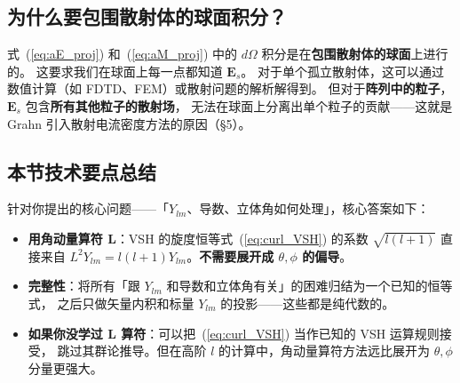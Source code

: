 \subsection{为什么要包围散射体的球面积分？}

\begin{noteworthy}
式~(\ref{eq:aE_proj}) 和~(\ref{eq:aM_proj}) 中的 $d\Omega$ 积分是在\textbf{包围散射体的球面}上进行的。
这要求我们在球面上每一点都知道 $\mathbf{E}_s$。
对于单个孤立散射体，这可以通过数值计算（如 FDTD、FEM）或散射问题的解析解得到。
但对于\textbf{阵列中的粒子}，$\mathbf{E}_s$ 包含\textbf{所有其他粒子的散射场}，
无法在球面上分离出单个粒子的贡献——这就是 Grahn 引入散射电流密度方法的原因（\S5）。
\end{noteworthy}

\subsection{本节技术要点总结}

针对你提出的核心问题——「$Y_{lm}$、导数、立体角如何处理」，核心答案如下：

\begin{itemize}
  \item \textbf{用角动量算符 $\mathbf{L}$}：VSH 的旋度恒等式~(\ref{eq:curl_VSH}) 的系数 $\sqrt{l(l+1)}$
    直接来自 $L^2 Y_{lm} = l(l+1)Y_{lm}$。\textbf{不需要展开成 $\theta,\phi$ 的偏导}。
  \item \textbf{完整性}：将所有「跟 $Y_{lm}$ 和导数和立体角有关」的困难归结为一个已知的恒等式，
    之后只做矢量内积和标量 $Y_{lm}$ 的投影——这些都是纯代数的。
  \item \textbf{如果你没学过 $\mathbf{L}$ 算符}：可以把~(\ref{eq:curl_VSH}) 当作已知的 VSH 运算规则接受，
    跳过其群论推导。但在高阶 $l$ 的计算中，角动量算符方法远比展开为 $\theta,\phi$ 分量更强大。
\end{itemize}


